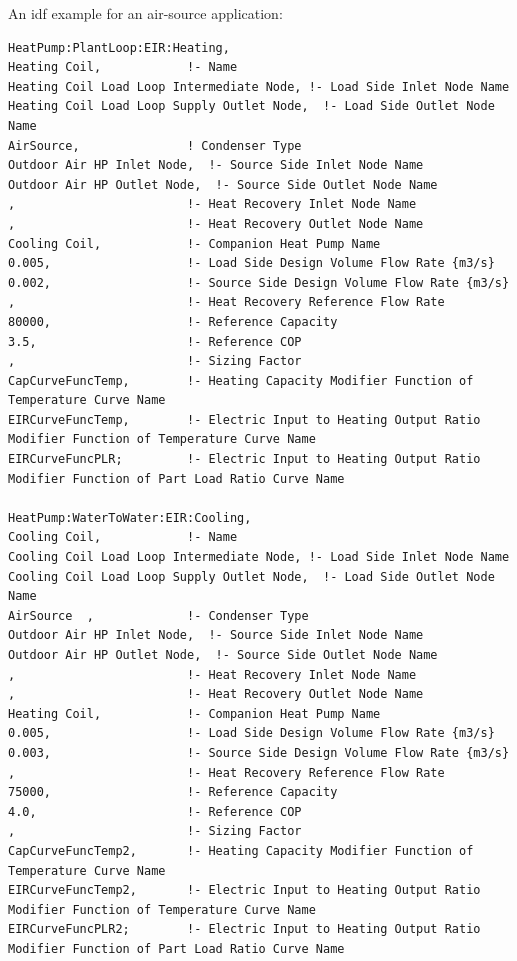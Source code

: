 An idf example for an air-source application:

\begin{lstlisting}
HeatPump:PlantLoop:EIR:Heating,
Heating Coil,            !- Name
Heating Coil Load Loop Intermediate Node, !- Load Side Inlet Node Name
Heating Coil Load Loop Supply Outlet Node,  !- Load Side Outlet Node Name
AirSource,               ! Condenser Type
Outdoor Air HP Inlet Node,  !- Source Side Inlet Node Name
Outdoor Air HP Outlet Node,  !- Source Side Outlet Node Name
,                        !- Heat Recovery Inlet Node Name
,                        !- Heat Recovery Outlet Node Name
Cooling Coil,            !- Companion Heat Pump Name
0.005,                   !- Load Side Design Volume Flow Rate {m3/s}
0.002,                   !- Source Side Design Volume Flow Rate {m3/s}
,                        !- Heat Recovery Reference Flow Rate
80000,                   !- Reference Capacity
3.5,                     !- Reference COP
,                        !- Sizing Factor
CapCurveFuncTemp,        !- Heating Capacity Modifier Function of Temperature Curve Name
EIRCurveFuncTemp,        !- Electric Input to Heating Output Ratio Modifier Function of Temperature Curve Name
EIRCurveFuncPLR;         !- Electric Input to Heating Output Ratio Modifier Function of Part Load Ratio Curve Name

HeatPump:WaterToWater:EIR:Cooling,
Cooling Coil,            !- Name
Cooling Coil Load Loop Intermediate Node, !- Load Side Inlet Node Name
Cooling Coil Load Loop Supply Outlet Node,  !- Load Side Outlet Node Name
AirSource  ,             !- Condenser Type
Outdoor Air HP Inlet Node,  !- Source Side Inlet Node Name
Outdoor Air HP Outlet Node,  !- Source Side Outlet Node Name
,                        !- Heat Recovery Inlet Node Name
,                        !- Heat Recovery Outlet Node Name
Heating Coil,            !- Companion Heat Pump Name
0.005,                   !- Load Side Design Volume Flow Rate {m3/s}
0.003,                   !- Source Side Design Volume Flow Rate {m3/s}
,                        !- Heat Recovery Reference Flow Rate
75000,                   !- Reference Capacity
4.0,                     !- Reference COP
,                        !- Sizing Factor
CapCurveFuncTemp2,       !- Heating Capacity Modifier Function of Temperature Curve Name
EIRCurveFuncTemp2,       !- Electric Input to Heating Output Ratio Modifier Function of Temperature Curve Name
EIRCurveFuncPLR2;        !- Electric Input to Heating Output Ratio Modifier Function of Part Load Ratio Curve Name
\end{lstlisting}

